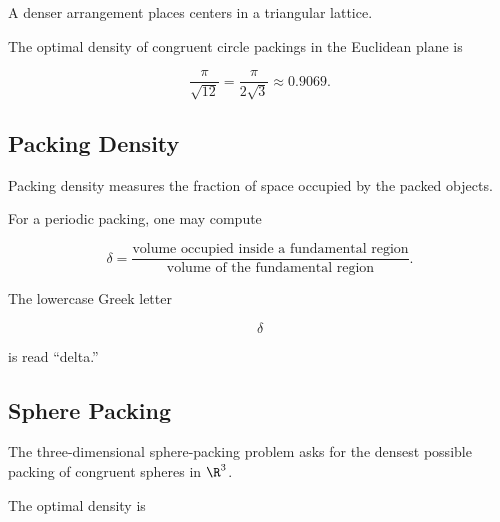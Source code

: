 A denser arrangement places centers in a triangular lattice.

\begin{centereddiagram}
\end{centereddiagram}

The optimal density of congruent circle packings in the Euclidean plane is

\[
\boxed{
\frac{\pi}{\sqrt{12}}
=
\frac{\pi}{2\sqrt3}
\approx0.9069.
}
\]

\subsection{Packing Density}
\label{subsec:packing-density}

Packing density measures the fraction of space occupied by the packed
objects.

For a periodic packing, one may compute

\[
\boxed{
\delta
=
\frac{
\text{volume occupied inside a fundamental region}
}{
\text{volume of the fundamental region}
}.
}
\]

The lowercase Greek letter

\[
\delta
\]

is read ``delta.''

\subsection{Sphere Packing}
\label{subsec:sphere-packing}

The three-dimensional sphere-packing problem asks for the densest possible
packing of congruent spheres in \(\R^3\).

The optimal density is

